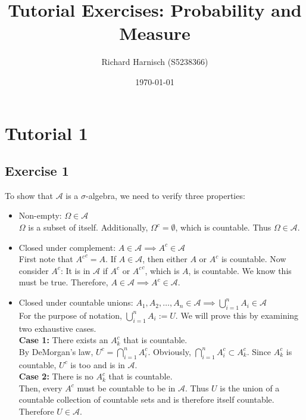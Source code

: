 \documentclass{article}
\title{Tutorial Exercises: Probability and Measure}
\author{Richard Harnisch (S5238366)}
\date{\today}
\begin{document}
\maketitle

\section*{Tutorial 1}
\subsection*{Exercise 1}

To show that $\mathcal{A}$ is a $\sigma$-algebra, we need to verify three properties:
\begin{itemize}
    \item Non-empty: $\Omega \in \mathcal{A}$ \\
    $\Omega$ is a subset of itself. Additionally, $\Omega^c = \emptyset$, which is countable. Thus $\Omega \in \mathcal{A}$.

    \item Closed under complement: $A \in \mathcal{A} \implies A^c \in \mathcal{A}$ \\
    First note that ${A^c}^c = A$. If $A \in \mathcal{A}$, then either $A$ or $A^c$ is countable. Now consider $A^c$: It is in $\mathcal{A}$ if $A^c$ or ${A^c}^c$, which is $A$, is countable. We know this must be true. Therefore, $A \in \mathcal{A} \implies A^c \in \mathcal{A}$. 

    \item Closed under countable unions: $A_1, A_2, \dots, A_n \in \mathcal{A} \implies \bigcup_{i=1}^{n} A_i \in \mathcal{A}$ \\
    For the purpose of notation, $\bigcup_{i=1}^{n} A_i := U$. We will prove this by examining two exhaustive cases. \\
    \textbf{Case 1:} There exists an $A^c_k$ that is countable. \\
    By DeMorgan's law, $U^c = \bigcap_{i=1}^{n} A^c_i$. Obviously, $\bigcap_{i=1}^{n} A^c_i \subset A^c_k$. Since $A^c_k$ is countable, $U^c$ is too and is in $\mathcal{A}$. \\
    \textbf{Case 2:} There is no $A^c_k$ that is countable. \\
    Then, every $A^c$ must be countable to be in $\mathcal{A}$. Thus $U$ is the union of a countable collection of countable sets and is therefore itself countable. Therefore $U \in \mathcal{A}$.
\end{itemize}
\pagebreak
\end{document}
